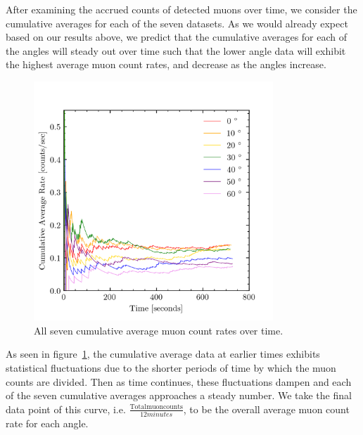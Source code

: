 \documentclass[aps,twocolumn,secnumarabic,balancelastpage,amsmath,amssymb,nofootinbib, floatfix]{revtex4-2}
\begin{document}
	After examining the accrued counts of detected muons over time, we consider the cumulative averages for each of the seven datasets. As we would already expect based on our results above, we predict that the cumulative averages for each of the angles will steady out over time such that the lower angle data will exhibit the highest average muon count rates, and decrease as the angles increase.
	
	\begin{figure}[H]
		\centering
		\includegraphics[width=9cm]{cum_avg_all.png}
		\caption{All seven cumulative average muon count rates over time.}
		\label{fig:all_cumavg}
	\end{figure}

	As seen in figure~\ref{fig:all_cumavg}, the cumulative average data at earlier times exhibits statistical fluctuations due to the shorter periods of time by which the muon counts are divided. Then as time continues, these fluctuations dampen and each of the seven cumulative averages approaches a steady number. We take the final data point of this curve, i.e. $\frac{\mathrm{Total muon counts}}{12 minutes}$, to be the overall average muon count rate for each angle. 	
	
\end{document}

